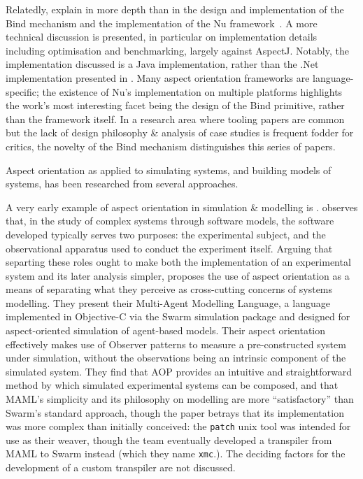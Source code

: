 Relatedly, \citeauthor{dyerNUmasters} explain in more depth than in the design
and implementation of the Bind mechanism and the implementation of the Nu
framework~\cite{dyerNUmasters}. A more technical discussion is presented, in
particular on implementation details including optimisation and benchmarking,
largely against AspectJ. Notably, the implementation discussed is a Java
implementation, rather than the .Net implementation presented in
\cite{rajan2006nu}. Many aspect orientation frameworks are language-specific;
the existence of Nu's implementation on multiple platforms highlights the work's
most interesting facet being the design of the Bind primitive, rather than the
framework itself. In a research area where tooling papers are common but the
lack of design philosophy \& analysis of case studies is frequent fodder for
critics, the novelty of the Bind mechanism distinguishes this series of papers.



Aspect orientation as applied to simulating systems, and building models of
systems, has been researched from several approaches.

A very early example of aspect orientation in simulation \& modelling is
\cite{gulyas1999use}. \citeauthor{gulyas1999use} observes that, in the study of
complex systems through software models, the software developed typically serves
two purposes: the experimental subject, and the observational apparatus used to
conduct the experiment itself. Arguing that separting these roles ought to make
both the implementation of an experimental system and its later analysis
simpler, \citeauthor{gulyas1999use} proposes the use of aspect orientation as a
means of separating what they perceive as cross-cutting concerns of systems
modelling. They present their Multi-Agent Modelling Language, a language
implemented in Objective-C via the Swarm simulation package and designed for
aspect-oriented simulation of agent-based models. Their aspect orientation
effectively makes use of Observer patterns to measure a pre-constructed system
under simulation, without the observations being an intrinsic component of the
simulated system. They find that AOP provides an intuitive and straightforward
method by which simulated experimental systems can be composed, and that MAML's
simplicity and its philosophy on modelling are more ``satisfactory'' than
Swarm's standard approach, though the paper betrays that its implementation was
more complex than initially conceived: the \lstinline{patch} unix tool was
intended for use as their weaver, though the team eventually developed a
transpiler from MAML to Swarm instead (which they name \lstinline{xmc}.). The
deciding factors for the development of a custom transpiler are not discussed.

